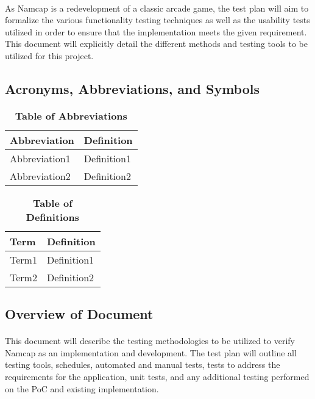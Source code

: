 \documentclass[12pt, titlepage]{article}
\begin{document}
\paragraph{}
As Namcap is a redevelopment of a classic arcade game, the test plan will aim to formalize the various functionality testing techniques as well as the usability tests utilized in order to ensure that the implementation meets the given requirement. This document will explicitly detail the different methods and testing tools to be utilized for this project.

\subsection{Acronyms, Abbreviations, and Symbols}
	
\begin{table}[hbp]
\caption{\textbf{Table of Abbreviations}} \label{Table}

\begin{tabularx}{\textwidth}{p{3cm}X}
\toprule
\textbf{Abbreviation} & \textbf{Definition} \\
\midrule
Abbreviation1 & Definition1\\
Abbreviation2 & Definition2\\
\bottomrule
\end{tabularx}

\end{table}

\begin{table}[!htbp]
\caption{\textbf{Table of Definitions}} \label{Table}

\begin{tabularx}{\textwidth}{p{3cm}X}
\toprule
\textbf{Term} & \textbf{Definition}\\
\midrule
Term1 & Definition1\\
Term2 & Definition2\\
\bottomrule
\end{tabularx}

\end{table}	

\subsection{Overview of Document}
\paragraph{}
This document will describe the testing methodologies to be utilized to verify Namcap as an implementation and development. The test plan will outline all testing tools, schedules, automated and manual tests, tests to address the requirements for the application, unit tests, and any additional testing performed on the PoC and existing implementation.
\end{document}
